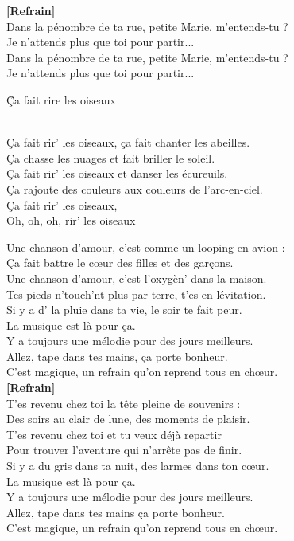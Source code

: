 \documentclass{novel}
\begin{document}
\textbf{[Refrain]}\\

Dans la pénombre de ta rue, petite Marie, m'entends-tu ? \\
Je n'attends plus que toi pour partir... \\
Dans la pénombre de ta rue, petite Marie, m'entends-tu ? \\
Je n'attends plus que toi pour partir... \\

\newpage
\normalsize

\h*{Ça fait rire les oiseaux}

\begin{bfseries}
[Refrain:]\\
Ça fait rir' les oiseaux, ça fait chanter les abeilles. \\
Ça chasse les nuages et fait briller le soleil. \\
Ça fait rir' les oiseaux et danser les écureuils. \\
Ça rajoute des couleurs aux couleurs de l'arc-en-ciel. \\
Ça fait rir' les oiseaux, \\
Oh, oh, oh, rir' les oiseaux \\
\end{bfseries}

Une chanson d'amour, c'est comme un looping en avion : \\
Ça fait battre le cœur des filles et des garçons. \\
Une chanson d'amour, c'est l'oxygèn' dans la maison. \\
Tes pieds n'touch'nt plus par terre, t'es en lévitation. \\
Si y a d' la pluie dans ta vie, le soir te fait peur. \\
La musique est là pour ça. \\
Y a toujours une mélodie pour des jours meilleurs. \\
Allez, tape dans tes mains, ça porte bonheur. \\
C'est magique, un refrain qu'on reprend tous en chœur. \\

\textbf{[Refrain]}\\

T'es revenu chez toi la tête pleine de souvenirs : \\
Des soirs au clair de lune, des moments de plaisir. \\
T'es revenu chez toi et tu veux déjà repartir \\
Pour trouver l'aventure qui n'arrête pas de finir. \\
Si y a du gris dans ta nuit, des larmes dans ton cœur. \\
La musique est là pour ça. \\
Y a toujours une mélodie pour des jours meilleurs. \\
Allez, tape dans tes mains ça porte bonheur. \\
C'est magique, un refrain qu'on reprend tous en chœur. \\
\end{document}
